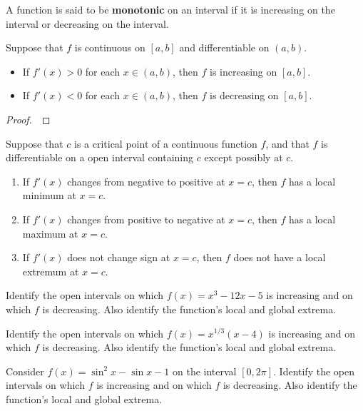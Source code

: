 \setcounter{chapter}{4}
\setcounter{section}{3}
\setcounter{theorem}{0}
\setcounter{equation}{0}


\begin{definition}
A function is said to be \textbf{monotonic} on an interval if it is increasing on the interval or decreasing on the interval.
\end{definition}

\begin{theorem}
Suppose that $f	$ is continuous on $[a,b]$ and differentiable on $(a,b)$.
\begin{itemize}
\item If $f'(x)>0$ for each $x\in (a,b)$, then $f$ is increasing on $[a,b]$.
\item If $f'(x)<0$ for each $x\in (a,b)$, then $f$ is decreasing on $[a,b]$.
\end{itemize}
\end{theorem}
\begin{proof}\,
\vspace{5.5in}

\end{proof}

\newpage

\begin{corollary}
Suppose that $c$ is a critical point of a continuous function $f$, and that $f$ is differentiable on a open interval containing $c$ except possibly at $c$.
\begin{enumerate}
\item If $f'(x)$ changes from negative to positive at $x=c$, then $f$ has a local minimum at $x=c$.
\item If $f'(x)$ changes from positive to negative at $x=c$, then $f$ has a local maximum at $x=c$.
\item If $f'(x)$ does not change sign at $x=c$, then $f$ does not have a local extremum at $x=c$.
\end{enumerate}
\end{corollary}

\begin{example}
Identify the open intervals on which $f(x)=x^3-12x-5$ is increasing and on which $f$ is decreasing.
Also identify the function's local and global extrema.
\end{example}

\newpage

\begin{example}
Identify the open intervals on which $f(x)=x^{1/3}(x-4)$ is increasing and on which $f$ is decreasing.
Also identify the function's local and global extrema.
\end{example}

\newpage

\begin{example}
Consider $f(x)=\sin^2 x -\sin x-1$ on the interval $[0,2\pi]$.
Identify the open intervals on which $f$ is increasing and on which $f$ is decreasing.
Also identify the function's local and global extrema.
\end{example}
